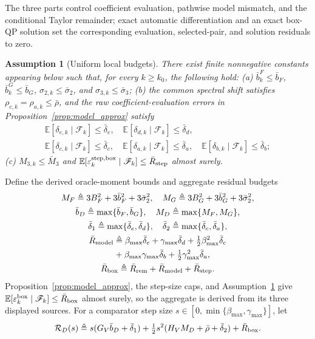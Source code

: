 \documentclass[journal]{IEEEtran}
\newtheorem{assumption}{Assumption}
\theoremstyle{remark}
\newcommand{\E}{\mathbb{E}}
\begin{document}
	The three parts control coefficient evaluation, pathwise model mismatch, and the conditional Taylor remainder; exact automatic differentiation and an exact box-QP solution set the corresponding evaluation, selected-pair, and solution residuals to zero.
	
	\begin{assumption}[Uniform local budgets]\label{ass:budget}
		There exist finite nonnegative constants appearing below such that, for every $k\ge k_0$, the following hold:
		(a) $\bar b_k^F\le\bar b_F$, $\bar b_k^G\le\bar b_G$, $\sigma_{2,k}\le\bar\sigma_2$, and $\sigma_{3,k}\le\bar\sigma_3$;
		(b) the common spectral shift satisfies $\rho_{c,k}=\rho_{a,k}\le\bar\rho$, and the raw coefficient-evaluation errors in Proposition~\ref{prop:model_approx} satisfy
		\[
		\begin{gathered}
			\E[\delta_{e,k}\mid\mathscr F_k]\le\bar\delta_e,
			\quad
			\E[\delta_{d,k}\mid\mathscr F_k]\le\bar\delta_d,\\
			\E[\delta_{c,k}\mid\mathscr F_k]\le\bar\delta_c,
			\quad
			\E[\delta_{a,k}\mid\mathscr F_k]\le\bar\delta_a,
			\quad
			\E[\delta_{b,k}\mid\mathscr F_k]\le\bar\delta_b;
		\end{gathered}
		\]
		(c) $M_{3,k}\le\bar M_3$ and $\E[\varepsilon_k^{\rm step,box}\mid\mathscr F_k]\le\bar R_{\rm step}$ almost surely.
	\end{assumption}
	
	Define the derived oracle-moment bounds and aggregate residual budgets
	\[
	\begin{gathered}
		M_F\triangleq3B_F^2+3\bar b_F^2+3\bar\sigma_2^2,
		\quad
		M_G\triangleq3B_G^2+3\bar b_G^2+3\bar\sigma_2^2,\\
		\bar b_D\triangleq\max\{\bar b_F,\bar b_G\},
		\quad
		M_D\triangleq\max\{M_F,M_G\},\\
		\bar\delta_1\triangleq\max\{\bar\delta_e,\bar\delta_d\},
		\quad
		\bar\delta_2\triangleq\max\{\bar\delta_c,\bar\delta_a\},\\
		\bar R_{\rm model}\triangleq{}
		\beta_{\max}\bar\delta_e+\gamma_{\max}\bar\delta_d
		+\tfrac12\beta_{\max}^2\bar\delta_c\\
		\quad{}+\beta_{\max}\gamma_{\max}\bar\delta_b
		+\tfrac12\gamma_{\max}^2\bar\delta_a,\\
		\bar R_{\rm box}\triangleq\bar R_{\rm rem}+\bar R_{\rm model}+\bar R_{\rm step}.
	\end{gathered}
	\]
	Proposition~\ref{prop:model_approx}, the step-size caps, and Assumption~\ref{ass:budget} give $\E[\varepsilon_k^{\rm box}\mid\mathscr F_k]\le\bar R_{\rm box}$ almost surely, so the aggregate is derived from its three displayed sources.
	For a comparator step size $s\in[0,\min\{\beta_{\max},\gamma_{\max}\}]$, let
	\begin{equation}\label{eq:R_direction}
		\mathcal R_D(s)
		\triangleq
		s(G_V\bar b_D+\bar\delta_1)
		+\tfrac12s^2(H_VM_D+\bar\rho+\bar\delta_2)
		+\bar R_{\rm box}.
	\end{equation}
	
\end{document}
